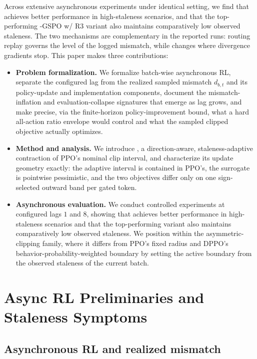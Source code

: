 Across extensive asynchronous experiments under identical setting, we find that \satr{} achieves better performance in high-staleness scenarios, and that the top-performing \satr{}-GSPO w/ R3 variant also maintains comparatively low observed staleness. The two mechanisms are complementary in the reported runs: routing replay governs the level of the logged mismatch, while \satr{} changes where divergence gradients stop.
This paper makes three contributions:
\begin{itemize}
\item \textbf{Problem formalization.} We formalize batch-wise asynchronous RL, separate the configured lag from the realized sampled mismatch $d_{b,t}$ and its policy-update and implementation components, document the mismatch-inflation and evaluation-collapse signatures that emerge as lag grows, and make precise, via the finite-horizon policy-improvement bound, what a hard all-action ratio envelope would control and what the sampled clipped objective actually optimizes.
\item \textbf{Method and analysis.} We introduce \satr{}, a direction-aware, staleness-adaptive contraction of PPO's nominal clip interval, and characterize its update geometry exactly: the adaptive interval is contained in PPO's, the surrogate is pointwise pessimistic, and the two objectives differ only on one sign-selected outward band per gated token.
\item \textbf{Asynchronous evaluation.} We conduct controlled experiments at configured lags $1$ and $8$, showing that \satr{} achieves better performance in high-staleness scenarios and that the top-performing \satr{} variant also maintains comparatively low observed staleness. We position \satr{} within the asymmetric-clipping family, where it differs from PPO's fixed radius and DPPO's behavior-probability-weighted boundary by setting the active boundary from the observed staleness of the current batch.
\end{itemize}
\section{Async RL Preliminaries and Staleness Symptoms}
\label{sec:tv}

\subsection{Asynchronous RL and realized mismatch}
\label{sec:setup}

